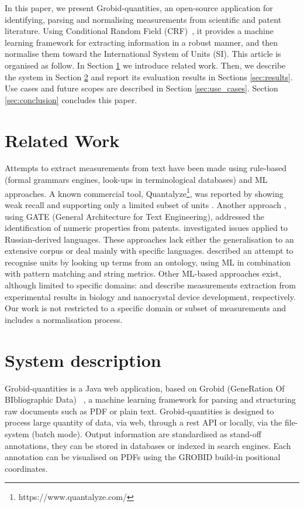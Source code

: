\documentclass[sigconf]{acmart}
\begin{document}
In this paper, we present Grobid-quantities, an open-source application for identifying, parsing and normalising measurements from scientific and patent literature. Using Conditional Random Field (CRF)~\cite{lafferty2001conditional}, it provides a machine learning framework for extracting information in a robust manner, and then normalise them toward the International System of Units (SI). 
This article is organised as follow. In Section \ref{sec:related_work} we introduce related work. Then, we describe the system in Section \ref{sec:system} and report its evaluation results in Sections \ref{sec:results}. Use cases and future scopes are described in Section \ref{sec:use_cases}. Section \ref{sec:conclusion} concludes this paper.

\section{Related Work}
\label{sec:related_work}
Attempts to extract measurements from text have been made using rule-based (formal grammars engines, look-ups in terminological databases) and ML approaches. A known commercial tool, Quantalyze\footnote{https://www.quantalyze.com/}, was reported by \cite{hundman2017measurement} showing weak recall and supporting only a limited subset of units \cite{aras2014applications}. Another approach \cite{agatonovic2008large}, using GATE (General Architecture for Text Engineering), addressed the identification of numeric properties from patents. \cite{am2013processing} investigated issues applied to Russian-derived languages. These approaches lack either the generalisation to an extensive corpus or deal mainly with specific languages. \cite{berrahou2013extract} described an attempt to recognise units by looking up terms from an ontology, using ML in combination with pattern matching and string metrics. Other ML-based approaches exist, although limited to specific domains: \cite{kang_extracting_2013} and \cite{dieb2015framework} describe measurements extraction from experimental results in biology and nanocrystal device development, respectively. Our work is not restricted to a specific domain or subset of measurements and includes a normalisation process. 

\section{System description}
\label{sec:system}
Grobid-quantities is a Java web application, based on Grobid (GeneRation Of BIbliographic Data)~\cite{GROBID} \cite{lopez2009grobid}, a machine learning framework for parsing and structuring raw documents such as PDF or plain text. 
Grobid-quantities is designed to process large quantity of data, via web, through a rest API or locally, via the file-system (batch mode). 
Output information are standardised as stand-off annotations, they can be stored in databases or indexed in search engines. Each annotation can be visualised on PDFs using the GROBID build-in positional coordinates.
\end{document}
